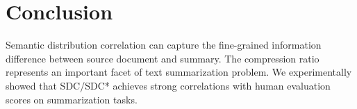 \section{Conclusion}
Semantic distribution correlation can capture the fine-grained 
information difference between source document and summary. 
The compression ratio represents an important facet of text summarization
problem.
We experimentally showed that SDC/SDC* achieves strong correlations 
with human evaluation scores on summarization tasks. 

